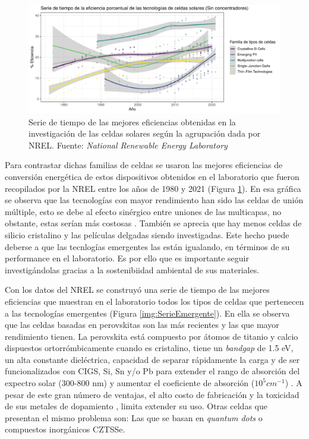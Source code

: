 \begin{figure}[h!]
    \begin{center}
        \includegraphics[scale=0.6]{img/familia_celdas.pdf}
    \end{center}
    \caption{Serie de tiempo de las mejores eficiencias obtenidas en la investigación de las celdas solares según la agrupación dada por NREL.
    Fuente: \textit{National Renewable Energy Laboratory} \cite{nrel}}
    \label{img:SerieTiempo}
\end{figure}

Para contrastar dichas familias de celdas se usaron las mejores eficiencias de conversión energética de estos dispositivos obtenidos en el laboratorio que fueron recopilados por la NREL entre los años de 1980 y 2021 (Figura \ref{img:SerieTiempo}). En esa gráfica se observa que las tecnologías con mayor rendimiento han sido las celdas de unión múltiple, esto se debe al efecto sinérgico entre uniones de las multicapas, no obstante, estas serían más costosas \cite{chowdhury2020overview}. También se aprecia que hay menos celdas de silicio cristalino y las películas delgadas siendo investigadas. Este hecho puede deberse a que las tecnlogías emergentes las están igualando, en términos de su performance en el laboratorio. Es por ello que es importante seguir investigándolas gracias a la sostenibiidad ambiental de sus materiales. 

Con los datos del NREL se construyó una serie de tiempo de las mejores eficiencias que muestran en el laboratorio todos los tipos de celdas que pertenecen a las tecnologías emergentes  (Figura \ref{img:SerieEmergente}). En ella se observa que las celdas basadas en perovskitas son las más recientes y las que mayor rendimiento tienen. La perovskita está compuesto por átomos de titanio y calcio dispuestos ortorrómbicamente cuando es cristalino, tiene un \textit{bandgap} de 1.5 eV, un alta constante dieléctrica, capacidad de separar rápidamente la carga y de ser funcionalizados con CIGS, Si, Sn y/o Pb para extender el rango de absorción del expectro solar (300-800 nm) y aumentar el coeficiente de absorción ($10^5cm^{-1}$) \cite{velilla2019outdoor}. A pesar de este gran número de ventajas, el alto costo de fabricación y la toxicidad de sus metales de dopamiento \cite{wang2022sustainable}, limita extender su uso. Otras celdas que presentan el mismo problema son: Las que se basan en \textit{quantum dots}\cite{pan2014high} o compuestos inorgánicos CZTSSe\cite{suryawanshi2013czts}. 

